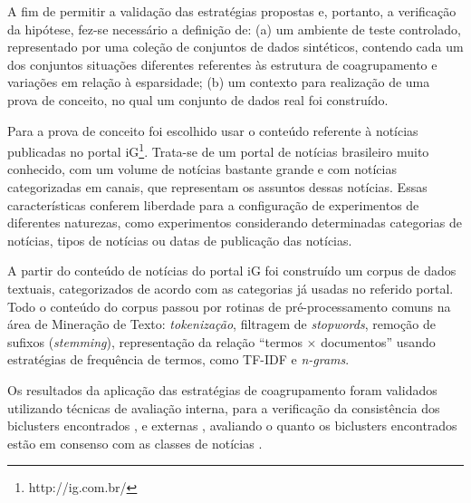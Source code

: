 \documentclass[
    12pt,                %
    oneside,            %
    a4paper,            %
    english,            %
    brazil                %
    ]{abntex2ppgsi}
\begin{document}
A fim de permitir a validação das estratégias propostas e, portanto, a verificação da  hipótese, fez-se necessário a definição de: (a) um ambiente de teste controlado, representado por uma coleção de conjuntos de dados sintéticos, contendo cada um dos conjuntos situações diferentes referentes às estrutura de coagrupamento e variações em relação à esparsidade;  (b) um contexto para realização de uma prova de conceito, no qual um conjunto de dados real foi construído.

Para a prova de conceito foi escolhido usar o conteúdo referente à notícias publicadas no portal iG\footnote{http://ig.com.br/}.
Trata-se de um portal de notícias brasileiro muito conhecido, com um volume de notícias bastante grande e com notícias categorizadas em canais, que representam os assuntos dessas notícias. Essas características conferem liberdade para a configuração de experimentos de diferentes naturezas, como experimentos considerando determinadas categorias de notícias, tipos de notícias ou datas de publicação das notícias.

A partir do conteúdo de notícias do portal iG foi construído um corpus de dados textuais, categorizados de acordo com as categorias já usadas no referido portal.
Todo o conteúdo do corpus passou por rotinas de pré-processamento comuns na área de Mineração de Texto: \textit{tokenização}, filtragem de \textit{stopwords}, remoção de sufixos (\textit{stemming}), representação da relação ``termos $\times$ documentos'' usando estratégias de frequência de termos, como TF-IDF e \textit{n-grams}.


Os resultados da aplicação das estratégias de coagrupamento foram validados utilizando técnicas de avaliação interna, para a verificação da consistência dos biclusters encontrados \cite{Santamaria2007}, e externas \cite{Hochreiter2010}, avaliando o quanto os biclusters encontrados estão em consenso com as classes de notícias \cite{Hochreiter2010}.
\end{document}
